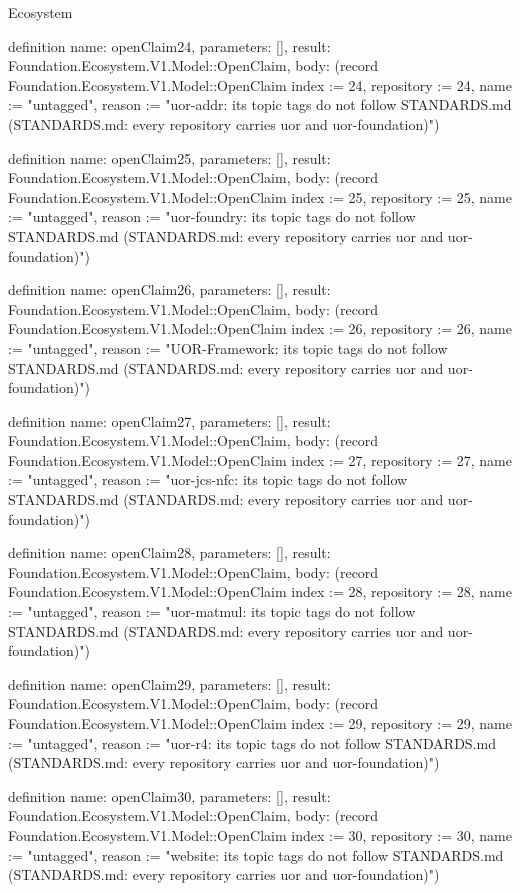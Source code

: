 \begin{lexlean}{Ecosystem}
\begin{semanticmodule}
definition{
  name: openClaim24,
  parameters: [],
  result: Foundation.Ecosystem.V1.Model::OpenClaim,
  body: (record Foundation.Ecosystem.V1.Model::OpenClaim {index := 24, repository := 24, name := "untagged", reason := "uor-addr: its topic tags do not follow STANDARDS.md (STANDARDS.md: every repository carries uor and uor-foundation)"})
}

definition{
  name: openClaim25,
  parameters: [],
  result: Foundation.Ecosystem.V1.Model::OpenClaim,
  body: (record Foundation.Ecosystem.V1.Model::OpenClaim {index := 25, repository := 25, name := "untagged", reason := "uor-foundry: its topic tags do not follow STANDARDS.md (STANDARDS.md: every repository carries uor and uor-foundation)"})
}

definition{
  name: openClaim26,
  parameters: [],
  result: Foundation.Ecosystem.V1.Model::OpenClaim,
  body: (record Foundation.Ecosystem.V1.Model::OpenClaim {index := 26, repository := 26, name := "untagged", reason := "UOR-Framework: its topic tags do not follow STANDARDS.md (STANDARDS.md: every repository carries uor and uor-foundation)"})
}

definition{
  name: openClaim27,
  parameters: [],
  result: Foundation.Ecosystem.V1.Model::OpenClaim,
  body: (record Foundation.Ecosystem.V1.Model::OpenClaim {index := 27, repository := 27, name := "untagged", reason := "uor-jcs-nfc: its topic tags do not follow STANDARDS.md (STANDARDS.md: every repository carries uor and uor-foundation)"})
}

definition{
  name: openClaim28,
  parameters: [],
  result: Foundation.Ecosystem.V1.Model::OpenClaim,
  body: (record Foundation.Ecosystem.V1.Model::OpenClaim {index := 28, repository := 28, name := "untagged", reason := "uor-matmul: its topic tags do not follow STANDARDS.md (STANDARDS.md: every repository carries uor and uor-foundation)"})
}

definition{
  name: openClaim29,
  parameters: [],
  result: Foundation.Ecosystem.V1.Model::OpenClaim,
  body: (record Foundation.Ecosystem.V1.Model::OpenClaim {index := 29, repository := 29, name := "untagged", reason := "uor-r4: its topic tags do not follow STANDARDS.md (STANDARDS.md: every repository carries uor and uor-foundation)"})
}

definition{
  name: openClaim30,
  parameters: [],
  result: Foundation.Ecosystem.V1.Model::OpenClaim,
  body: (record Foundation.Ecosystem.V1.Model::OpenClaim {index := 30, repository := 30, name := "untagged", reason := "website: its topic tags do not follow STANDARDS.md (STANDARDS.md: every repository carries uor and uor-foundation)"})
}


\end{semanticmodule}
\end{lexlean}
